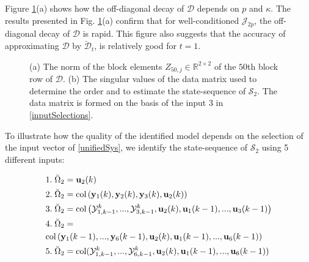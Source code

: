 \documentclass[journal,10pt]{IEEEtran}
\begin{document}
\par
Figure \ref{decayFinv}(a) shows how the off-diagonal decay of $\mathcal{D}$ depends on $p$ and $\kappa$. The results presented in Fig. \ref{decayFinv}(a) confirm that for well-conditioned $\mathcal{J}_{2p}$, the off-diagonal decay of $\mathcal{D}$ is rapid. This figure also suggests that the accuracy of approximating $\mathcal{D}$ by $\breve{\mathcal{D}}_{t}$, is relatively good for $t=1$.
\begin{figure}[H]
\centering
 \;\;
 \caption{\small{(a) The norm of the block elements $Z_{50,j}\in \mathbb{R}^{2\times 2}$ of the $50$th block row of $\mathcal{D}$. (b) The singular values of the data matrix used to determine the order and to estimate the state-sequence of $\mathcal{S}_{2}$. The data matrix is formed on the basis of the input $3$ in \eqref{inputSelections}.}}
\label{decayFinv}
\end{figure}
 To illustrate how the quality of the identified model depends on the selection of the input vector of \eqref{unifiedSys}, we identify the state-sequence of $\mathcal{S}_{2}$ using 5 different inputs:
\begin{small}
\begin{align}
&1. \;\breve{\Omega}_{2}=\mathbf{u}_{2}(k) \notag 
 \\
&2. \;\breve{\Omega}_{2}=\text{col}\left(\mathbf{y}_{1}(k),\mathbf{y}_{2}(k),\mathbf{y}_{3}(k),\mathbf{u}_{2}(k)\right) \notag 
 \\
&3. \;\breve{\Omega}_{2}=\text{col}\left(\mathcal{Y}_{1,k-1}^{k},...,\mathcal{Y}_{3,k-1}^{k},\mathbf{u}_{2}(k),\mathbf{u}_{1}(k-1),..., \mathbf{u}_{3}(k-1)\right) \notag 
 \\
&4. \;\breve{\Omega}_{2}= \notag \\
&\text{col}\left(\mathbf{y}_{1}(k-1),...,\mathbf{y}_{6}(k-1),\mathbf{u}_{2}(k),\mathbf{u}_{1}(k-1),..., \mathbf{u}_{6}(k-1)\right) 
\notag \\
& 5. \;\breve{\Omega}_{2}=\text{col}(\mathcal{Y}_{1,k-1}^{k},...,\mathcal{Y}_{6,k-1}^{k},\mathbf{u}_{2}(k),\mathbf{u}_{1}(k-1),..., \mathbf{u}_{6}(k-1)) 
\label{inputSelections}
\end{align}
\end{small}
\end{document}
